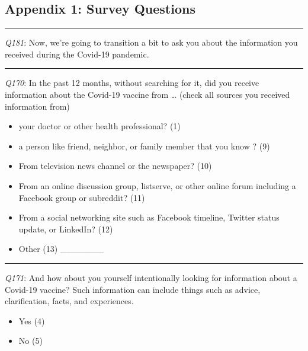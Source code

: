 \newpage
\begin{singlespace}
\hypertarget{appendix-1-survey-questions}{%
\section{Appendix 1: Survey Questions}\label{appendix-1-survey-questions}}

\begin{center}\rule{0.5\linewidth}{0.5pt}\end{center}

\emph{Q181}: Now, we're going to transition a bit to ask you about the information you received during the Covid-19 pandemic.

\begin{center}\rule{0.5\linewidth}{0.5pt}\end{center}

\emph{Q170}: In the past 12 months, without searching for it, did you receive information about the Covid-19 vaccine from \ldots{} (check all sources you received information from)

\begin{itemize}
\tightlist
\item
  your doctor or other health professional? (1)
\item
  a person like friend, neighbor, or family member that you know ? (9)
\item
  From television news channel or the newspaper? (10)
\item
  From an online discussion group, listserve, or other online forum including a Facebook group or subreddit? (11)
\item
  From a social networking site such as Facebook timeline, Twitter status update, or LinkedIn? (12)
\item
  Other (13) \_\_\_\_\_\_\_
\end{itemize}

\begin{center}\rule{0.5\linewidth}{0.5pt}\end{center}

\emph{Q171}: And how about you yourself intentionally looking for information about a Covid-19 vaccine? Such information can include things such as advice, clarification, facts, and experiences.

\begin{itemize}
\tightlist
\item
  Yes (4)
\item
  No (5)
\end{itemize}


\end{singlespace}
